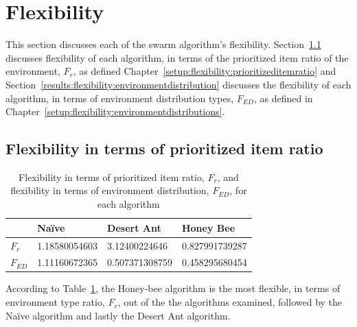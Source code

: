 \section{Flexibility}
\label{results:flexibility}

This section discusses each of the swarm algorithm's flexibility. Section~\ref{results:prioritizeditemratio} discusses flexibility of each algorithm, in terms of the prioritized item ratio of the environment, $F_r$, as defined Chapter~\ref{setup:flexibility:prioritizeditemratio} and Section~\ref{results:flexibility:environmentdistribution} discusses the flexibility of each algorithm, in terms of environment distribution types, $F_{ED}$, as defined in Chapter~\ref{setup:flexibility:environmentdistributions}.

\subsection{Flexibility in terms of prioritized item ratio}
\label{results:prioritizeditemratio}

\begin{table}[]
\centering
\caption{Flexibility in terms of prioritized item ratio, $F_r$, and flexibility in terms of environment distribution, $F_{ED}$, for each algorithm}
\label{table:flexibility}
\begin{tabular}{@{}llll@{}}
\toprule
\textbf{}         & Na\"ive         & Desert Ant        & Honey Bee         \\ \midrule
\textbf{$F_r$}    & 1.18580054603 & 3.12400224646     & 0.827991739287    \\ \midrule
\textbf{$F_{ED}$} & 1.11160672365 & 0.507371308759 & 0.458295680454 
\end{tabular}
\end{table}

According to Table~\ref{table:flexibility}, the Honey-bee algorithm is the most flexible, in terms of environment type ratio, $F_r$, out of the the algorithms examined, followed by the Na\"ive algorithm and lastly the Desert Ant algorithm. 


